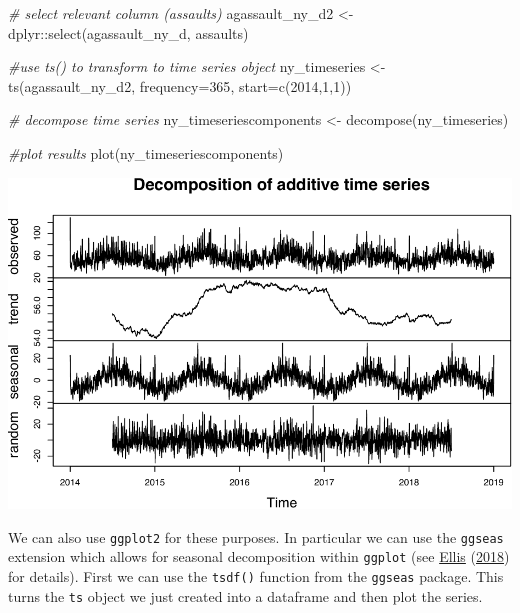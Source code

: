 \documentclass[
]{book}
\newenvironment{Shaded}{\begin{snugshade}}{\end{snugshade}}
\newcommand{\AttributeTok}[1]{\textcolor[rgb]{0.77,0.63,0.00}{#1}}
\newcommand{\CommentTok}[1]{\textcolor[rgb]{0.56,0.35,0.01}{\textit{#1}}}
\newcommand{\DecValTok}[1]{\textcolor[rgb]{0.00,0.00,0.81}{#1}}
\newcommand{\FunctionTok}[1]{\textcolor[rgb]{0.00,0.00,0.00}{#1}}
\newcommand{\NormalTok}[1]{#1}
\newcommand{\OtherTok}[1]{\textcolor[rgb]{0.56,0.35,0.01}{#1}}
\newcommand{\SpecialCharTok}[1]{\textcolor[rgb]{0.00,0.00,0.00}{#1}}
\begin{document}
\begin{Shaded}
\begin{Highlighting}[]
\CommentTok{\# select relevant column (assaults)}
\NormalTok{agassault\_ny\_d2 }\OtherTok{\textless{}{-}}\NormalTok{ dplyr}\SpecialCharTok{::}\FunctionTok{select}\NormalTok{(agassault\_ny\_d, assaults)}

\CommentTok{\#use ts() to transform to time series object}
\NormalTok{ny\_timeseries }\OtherTok{\textless{}{-}} \FunctionTok{ts}\NormalTok{(agassault\_ny\_d2, }
                    \AttributeTok{frequency=}\DecValTok{365}\NormalTok{, }
                    \AttributeTok{start=}\FunctionTok{c}\NormalTok{(}\DecValTok{2014}\NormalTok{,}\DecValTok{1}\NormalTok{,}\DecValTok{1}\NormalTok{))}

\CommentTok{\# decompose time series}
\NormalTok{ny\_timeseriescomponents }\OtherTok{\textless{}{-}} \FunctionTok{decompose}\NormalTok{(ny\_timeseries)}

\CommentTok{\#plot results}
\FunctionTok{plot}\NormalTok{(ny\_timeseriescomponents)}
\end{Highlighting}
\end{Shaded}

\includegraphics{crime_mapping_files/figure-latex/decompose_8b-1.pdf}

We can also use \texttt{ggplot2} for these purposes. In particular we can use the \texttt{ggseas} extension which allows for seasonal decomposition within \texttt{ggplot} (see \protect\hyperlink{ref-Ellis_2018}{Ellis} (\protect\hyperlink{ref-Ellis_2018}{2018}) for details). First we can use the \texttt{tsdf()} function from the \texttt{ggseas} package. This turns the \texttt{ts} object we just created into a dataframe and then plot the series.
\end{document}
